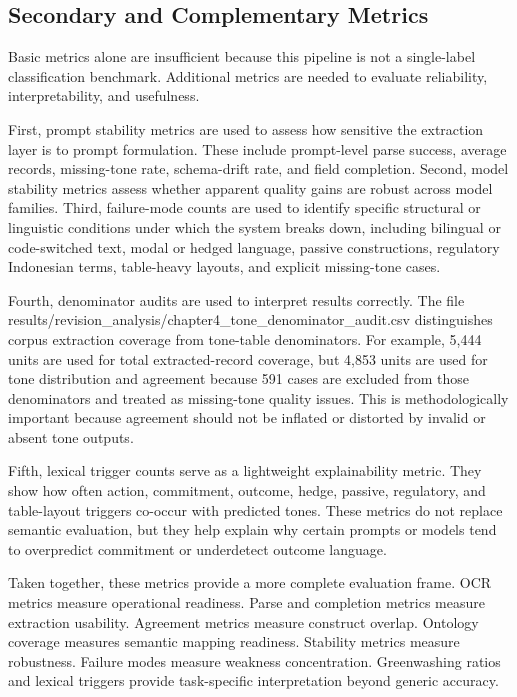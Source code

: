 \subsection{Secondary and Complementary Metrics}

Basic metrics alone are insufficient because this pipeline is not a single-label classification benchmark. Additional metrics are needed to evaluate reliability, interpretability, and usefulness.

First, prompt stability metrics are used to assess how sensitive the extraction layer is to prompt formulation. These include prompt-level parse success, average records, missing-tone rate, schema-drift rate, and field completion. Second, model stability metrics assess whether apparent quality gains are robust across model families. Third, failure-mode counts are used to identify specific structural or linguistic conditions under which the system breaks down, including bilingual or code-switched text, modal or hedged language, passive constructions, regulatory Indonesian terms, table-heavy layouts, and explicit missing-tone cases.

Fourth, denominator audits are used to interpret results correctly. The file results/revision\_analysis/chapter4\_tone\_denominator\_audit.csv distinguishes corpus extraction coverage from tone-table denominators. For example, 5,444 units are used for total extracted-record coverage, but 4,853 units are used for tone distribution and agreement because 591 cases are excluded from those denominators and treated as missing-tone quality issues. This is methodologically important because agreement should not be inflated or distorted by invalid or absent tone outputs.

Fifth, lexical trigger counts serve as a lightweight explainability metric. They show how often action, commitment, outcome, hedge, passive, regulatory, and table-layout triggers co-occur with predicted tones. These metrics do not replace semantic evaluation, but they help explain why certain prompts or models tend to overpredict commitment or underdetect outcome language.

Taken together, these metrics provide a more complete evaluation frame. OCR metrics measure operational readiness. Parse and completion metrics measure extraction usability. Agreement metrics measure construct overlap. Ontology coverage measures semantic mapping readiness. Stability metrics measure robustness. Failure modes measure weakness concentration. Greenwashing ratios and lexical triggers provide task-specific interpretation beyond generic accuracy.
